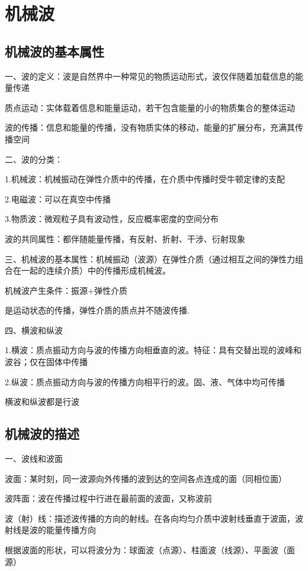 \documentclass[UTF8]{article}
\begin{document}
\section{机械波}
\subsection{机械波的基本属性}

    一、波的定义：波是自然界中一种常见的物质运动形式，波仅伴随着加载信息的能量传递

    质点运动：实体载着信息和能量运动，若干包含能量的小的物质集合的整体运动

    波的传播：信息和能量的传播，没有物质实体的移动，能量的扩展分布，充满其传播空间

    二、波的分类：

    1.机械波：机械振动在弹性介质中的传播，在介质中传播时受牛顿定律的支配

    2.电磁波：可以在真空中传播

    3.物质波：微观粒子具有波动性，反应概率密度的空间分布

    波的共同属性：都伴随能量传播，有反射、折射、干涉、衍射现象

    三、机械波的基本属性：机械振动（波源）在弹性介质（通过相互之间的弹性力组合在一起的连续介质）中的传播形成机械波。
    
    机械波产生条件：振源+弹性介质

    是运动状态的传播，弹性介质的质点并不随波传播.
    
    四、横波和纵波

    1.横波：质点振动方向与波的传播方向相垂直的波。特征：具有交替出现的波峰和波谷；仅在固体中传播

    2.纵波：质点振动方向与波的传播方向相平行的波。固、液、气体中均可传播

    横波和纵波都是行波

\subsection{机械波的描述}

    一、波线和波面

    波面：某时刻，同一波源向外传播的波到达的空间各点连成的面（同相位面）
    
    波阵面：波在传播过程中行进在最前面的波面，又称波前

    波（射）线：描述波传播的方向的射线。在各向均匀介质中波射线垂直于波面，波射线是波的能量传播方向

    根据波面的形状，可以将波分为：球面波（点源）、柱面波（线源）、平面波（面源）
\end{document}
